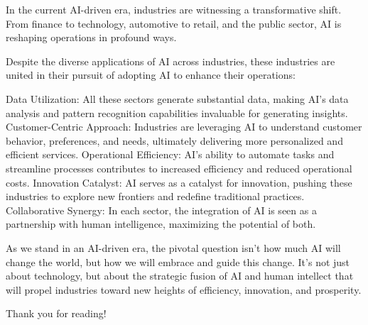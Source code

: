 \documentclass[
]{article}
\begin{document}
In the current AI-driven era, industries are witnessing a transformative shift. From finance to technology, automotive to retail, and the public sector, AI is reshaping operations in profound ways.

Despite the diverse applications of AI across industries, these industries are united in their pursuit of adopting AI to enhance their operations:

Data Utilization: All these sectors generate substantial data, making AI's data analysis and pattern recognition capabilities invaluable for generating insights.
Customer-Centric Approach: Industries are leveraging AI to understand customer behavior, preferences, and needs, ultimately delivering more personalized and efficient services.
Operational Efficiency: AI's ability to automate tasks and streamline processes contributes to increased efficiency and reduced operational costs.
Innovation Catalyst: AI serves as a catalyst for innovation, pushing these industries to explore new frontiers and redefine traditional practices.
Collaborative Synergy: In each sector, the integration of AI is seen as a partnership with human intelligence, maximizing the potential of both.

As we stand in an AI-driven era, the pivotal question isn't how much AI will change the world, but how we will embrace and guide this change. It's not just about technology, but about the strategic fusion of AI and human intellect that will propel industries toward new heights of efficiency, innovation, and prosperity.

Thank you for reading!
\end{document}
